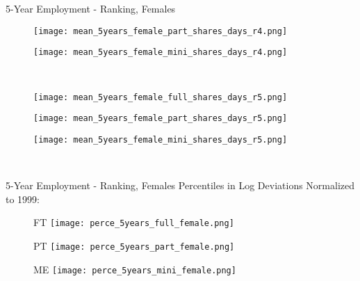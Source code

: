 \documentclass[hyperref={bookmarks=false}]{beamer}
\begin{document}
\begin{appendix}
\begin{frame}{5-Year Employment - Ranking, Females}
\begin{figure}[!t]
\begin{minipage}[b]{0.15\textwidth}{}
\centering
\texttt{[image: mean\_5years\_female\_part\_shares\_days\_r4.png]}
\end{minipage}
\begin{minipage}[b]{0.15\textwidth}{}
\centering
\texttt{[image: mean\_5years\_female\_mini\_shares\_days\_r4.png]}
\end{minipage}\\
\begin{minipage}[b]{0.15\textwidth}{}
\centering
\texttt{[image: mean\_5years\_female\_full\_shares\_days\_r5.png]}
\end{minipage}
\begin{minipage}[b]{0.15\textwidth}{}
\centering
\texttt{[image: mean\_5years\_female\_part\_shares\_days\_r5.png]}
\end{minipage}
\begin{minipage}[b]{0.15\textwidth}{}
\centering
\texttt{[image: mean\_5years\_female\_mini\_shares\_days\_r5.png]}
\end{minipage}\\
\end{figure}
\end{frame}

\begin{frame}{5-Year Employment - Ranking, Females}
Percentiles in Log Deviations Normalized to 1999:
\begin{figure}[!t]
\begin{minipage}[b]{0.3\textwidth}{FT}
\centering
\texttt{[image: perce\_5years\_full\_female.png]}
\end{minipage}
\begin{minipage}[b]{0.3\textwidth}{PT}
\centering
\texttt{[image: perce\_5years\_part\_female.png]}
\end{minipage}
\begin{minipage}[b]{0.3\textwidth}{ME}
\centering
\texttt{[image: perce\_5years\_mini\_female.png]}
\end{minipage}\\
\end{figure}
\hyperlink{DATA2}{}
\end{frame}



\end{appendix}
\end{document}

